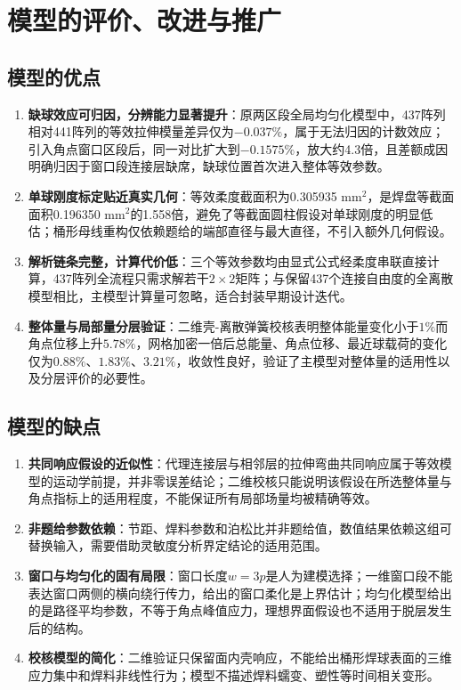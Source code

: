 \documentclass[draft,12pt,a4paper]{ctexart}
\theoremstyle{definition}
\begin{document}

\section{模型的评价、改进与推广}

\subsection{模型的优点}
\begin{enumerate}[itemsep=1pt]
  \item \textbf{缺球效应可归因，分辨能力显著提升}：原两区段全局均匀化模型中，437阵列相对441阵列的等效拉伸模量差异仅为$-0.037\%$，属于无法归因的计数效应；引入角点窗口区段后，同一对比扩大到$-0.1575\%$，放大约4.3倍，且差额成因明确归因于窗口段连接层缺席，缺球位置首次进入整体等效参数。
  \item \textbf{单球刚度标定贴近真实几何}：等效柔度截面积为0.305935 mm$^2$，是焊盘等截面面积0.196350 mm$^2$的1.558倍，避免了等截面圆柱假设对单球刚度的明显低估；桶形母线重构仅依赖题给的端部直径与最大直径，不引入额外几何假设。
  \item \textbf{解析链条完整，计算代价低}：三个等效参数均由显式公式经柔度串联直接计算，437阵列全流程只需求解若干$2\times2$矩阵；与保留437个连接自由度的全离散模型相比，主模型计算量可忽略，适合封装早期设计迭代。
  \item \textbf{整体量与局部量分层验证}：二维壳-离散弹簧校核表明整体能量变化小于$1\%$而角点位移上升$5.78\%$，网格加密一倍后总能量、角点位移、最近球载荷的变化仅为$0.88\%$、$1.83\%$、$3.21\%$，收敛性良好，验证了主模型对整体量的适用性以及分层评价的必要性。
\end{enumerate}

\subsection{模型的缺点}
\begin{enumerate}[itemsep=1pt]
  \item \textbf{共同响应假设的近似性}：代理连接层与相邻层的拉伸弯曲共同响应属于等效模型的运动学前提，并非零误差结论；二维校核只能说明该假设在所选整体量与角点指标上的适用程度，不能保证所有局部场量均被精确等效。
  \item \textbf{非题给参数依赖}：节距、焊料参数和泊松比并非题给值，数值结果依赖这组可替换输入，需要借助灵敏度分析界定结论的适用范围。
  \item \textbf{窗口与均匀化的固有局限}：窗口长度$w=3p$是人为建模选择；一维窗口段不能表达窗口两侧的横向绕行传力，给出的窗口柔化是上界估计；均匀化模型给出的是路径平均参数，不等于角点峰值应力，理想界面假设也不适用于脱层发生后的结构。
  \item \textbf{校核模型的简化}：二维验证只保留面内壳响应，不能给出桶形焊球表面的三维应力集中和焊料非线性行为；模型不描述焊料蠕变、塑性等时间相关变形。
\end{enumerate}
\end{document}
